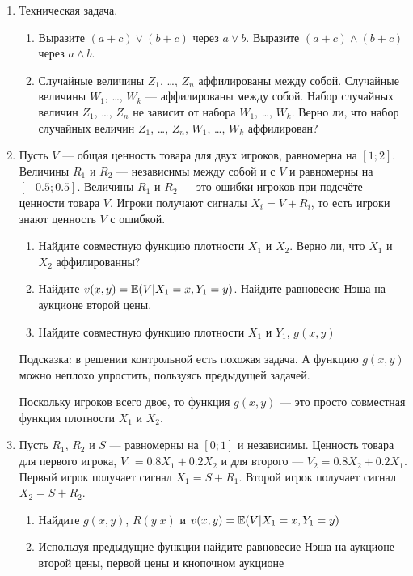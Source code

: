\begin{enumerate}


\item Техническая задача.
\begin{enumerate}
\item Выразите $ (a+c)\vee (b+c) $ через $ a\vee b $. Выразите $ (a+c)\wedge (b+c) $ через $ a\wedge b $. 
\item Случайные величины $ Z_{1} $, \ldots , $ Z_{n} $ аффилированы между собой. Случайные величины $ W_{1} $, \ldots , $ W_{k} $ — аффилированы между собой. Набор случайных величин $ Z_{1} $, \ldots , $ Z_{n} $ не зависит от набора $ W_{1} $, \ldots , $ W_{k} $. Верно ли, что набор случайных величин $ Z_{1} $, \ldots , $ Z_{n} $, $ W_{1} $, \ldots , $ W_{k} $ аффилирован?
\end{enumerate}


\item Пусть $  V $ — общая ценность товара для двух игроков, равномерна на $ [1;2] $. Величины $ R_{1} $ и $ R_{2} $ — независимы между собой и с $ V $ и равномерны на $ [-0.5;0.5] $. Величины $ R_{1} $ и $ R_{2} $ — это ошибки игроков при подсчёте ценности товара $ V $. Игроки получают сигналы $ X_{i}=V+R_{i} $, то есть игроки знают ценность  $ V $ с ошибкой.
\begin{enumerate}
\item Найдите совместную функцию плотности $ X_{1} $ и $ X_{2} $. Верно ли, что $ X_{1} $ и $ X_{2} $ аффилированны? 
\item Найдите $ v(x,y)=\operatorname{\mathbb{E}}(V|X_{1}=x,Y_{1}=y) $. Найдите равновесие Нэша на аукционе второй цены.
\item Найдите совместную функцию плотности $ X_{1} $ и $ Y_{1} $, $ g(x,y) $
\end{enumerate}

Подсказка: в решении контрольной есть похожая задача. А функцию $ g(x,y) $ можно неплохо упростить, пользуясь предыдущей задачей.

Поскольку игроков всего двое, то функция $ g(x,y)$ — это просто совместная функция плотности $ X_{1} $ и $ X_{2} $.


\item Пусть $ R_{1} $, $ R_{2} $ и $ S $ — равномерны на $ [0;1] $ и независимы. Ценность товара для первого игрока, $ V_{1}=0.8X_{1}+0.2X_{2} $ и для второго — $ V_{2}=0.8X_{2}+0.2X_{1} $. Первый игрок получает сигнал $ X_{1}=S+R_{1} $. Второй игрок получает сигнал $ X_{2}=S+R_{2} $.
\begin{enumerate}
\item Найдите $ g(x,y) $, $ R(y|x) $ и $ v(x,y)=\operatorname{\mathbb{E}}(V|X_{1}=x,Y_{1}=y) $
\item Используя предыдущие функции найдите равновесие Нэша на аукционе второй цены, первой цены и кнопочном аукционе
\end{enumerate}


\end{enumerate}
